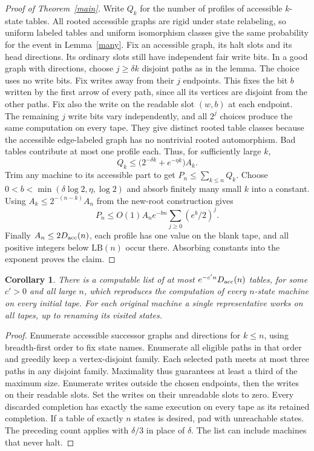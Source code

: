 \documentclass[11pt]{article}
\newtheorem*{corollary}{Corollary}
\newcommand{\LB}{\mathrm{LB}}
\begin{document}
\begin{proof}[Proof of Theorem~\ref{main}]
Write $Q_k$ for the number of profiles of accessible $k$-state tables. All rooted accessible graphs are rigid under state relabeling, so uniform labeled tables and uniform isomorphism classes give the same probability for the event in Lemma~\ref{many}. Fix an accessible graph, its halt slots and its head directions. Its ordinary slots still have independent fair write bits. In a good graph with directions, choose $j\ge\delta k$ disjoint paths as in the lemma. The choice uses no write bits. Fix writes away from their $j$ endpoints. This fixes the bit $b$ written by the first arrow of every path, since all its vertices are disjoint from the other paths. Fix also the write on the readable slot $(w,b)$ at each endpoint. The remaining $j$ write bits vary independently, and all $2^j$ choices produce the same computation on every tape. They give distinct rooted table classes because the accessible edge-labeled graph has no nontrivial rooted automorphism. Bad tables contribute at most one profile each. Thus, for sufficiently large $k$,
\[
 Q_k\le \bigl(2^{-\delta k}+e^{-\eta k}\bigr)A_k.
\]
Trim any machine to its accessible part to get $P_n\le\sum_{k\le n}Q_k$. Choose $0<b<\min(\delta\log 2,\eta,\log 2)$ and absorb finitely many small $k$ into a constant. Using $A_k\le 2^{-(n-k)}A_n$ from the new-root construction gives
\[
 P_n\le O(1)A_n e^{-bn}\sum_{j\ge0}(e^b/2)^j.
\]
Finally $A_n\le2D_{\rm acc}(n)$, each profile has one value on the blank tape, and all positive integers below $\LB(n)$ occur there. Absorbing constants into the exponent proves the claim.
\end{proof}

\begin{corollary}
There is a computable list of at most $e^{-c' n}D_{\rm acc}(n)$ tables, for some $c'>0$ and all large $n$, which reproduces the computation of every $n$-state machine on every initial tape. For each original machine a single representative works on all tapes, up to renaming its visited states.
\end{corollary}
\begin{proof}
Enumerate accessible successor graphs and directions for $k\le n$, using breadth-first order to fix state names. Enumerate all eligible paths in that order and greedily keep a vertex-disjoint family. Each selected path meets at most three paths in any disjoint family. Maximality thus guarantees at least a third of the maximum size. Enumerate writes outside the chosen endpoints, then the writes on their readable slots. Set the writes on their unreadable slots to zero. Every discarded completion has exactly the same execution on every tape as its retained completion. If a table of exactly $n$ states is desired, pad with unreachable states. The preceding count applies with $\delta/3$ in place of $\delta$. The list can include machines that never halt.
\end{proof}
\end{document}
